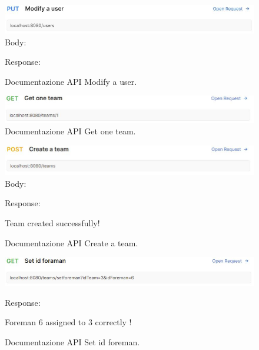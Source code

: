 \begin{figure}[h!]
	\centering
	\includegraphics[width=1\linewidth]{./Iterazione 2/ImageFiles/ModifyAUser}
	Body:
	
	Response: 
	
	\caption{Documentazione API Modify a user.}
	\label{fig:ModifyAUserAPI}
\end{figure}

\begin{figure}[h!]
	\centering
	\includegraphics[width=1\linewidth]{./Iterazione 2/ImageFiles/GetOneTeam}
	
	\caption{Documentazione API Get one team.}
	\label{fig:GetOneTeamAPI}
\end{figure}

\begin{figure}[h!]
	\centering
	\includegraphics[width=1\linewidth]{./Iterazione 2/ImageFiles/CreateATeam}
	Body:
	
	Response: 
	
	Team created successfully!
	\caption{Documentazione API Create a team.}
	\label{fig:CreateATeamAPI}
\end{figure}

\begin{figure}[h!]
	\centering
	\includegraphics[width=1\linewidth]{./Iterazione 2/ImageFiles/SetIdForemanRequest}
	
	Response: 
	
	Foreman 6 assigned to 3 correctly !
	\caption{Documentazione API Set id foreman.}
	\label{fig:SetIdForemanAPI}
\end{figure}


